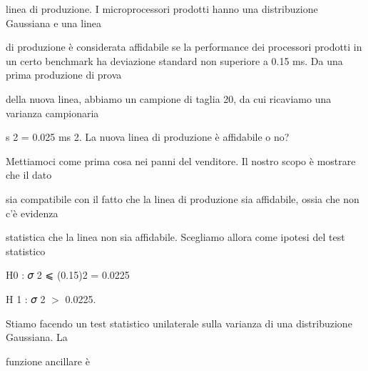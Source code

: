 \documentclass[a4paper,portrait,12pt]{article}
\begin{document}
\begin{flushleft}
linea di produzione. I microprocessori prodotti hanno una distribuzione Gaussiana e una linea
\end{flushleft}


\begin{flushleft}
di produzione \`{e} considerata affidabile se la performance dei processori prodotti in un certo benchmark ha deviazione standard non superiore a 0.15 ms. Da una prima produzione di prova
\end{flushleft}


\begin{flushleft}
della nuova linea, abbiamo un campione di taglia 20, da cui ricaviamo una varianza campionaria
\end{flushleft}


\begin{flushleft}
s 2 = 0.025 ms 2. La nuova linea di produzione \`{e} affidabile o no?
\end{flushleft}


\begin{flushleft}
Mettiamoci come prima cosa nei panni del venditore. Il nostro scopo \`{e} mostrare che il dato
\end{flushleft}


\begin{flushleft}
sia compatibile con il fatto che la linea di produzione sia affidabile, ossia che non c'\`{e} evidenza
\end{flushleft}


\begin{flushleft}
statistica che la linea non sia affidabile. Scegliamo allora come ipotesi del test statistico
\end{flushleft}


\begin{flushleft}
H0 : 𝜎 2 ⩽ (0.15)2 = 0.0225
\end{flushleft}


\begin{flushleft}
H 1 : 𝜎 2 $>$ 0.0225.
\end{flushleft}


\begin{flushleft}
Stiamo facendo un test statistico unilaterale sulla varianza di una distribuzione Gaussiana. La
\end{flushleft}


\begin{flushleft}
funzione ancillare \`{e}
\end{flushleft}
\end{document}

